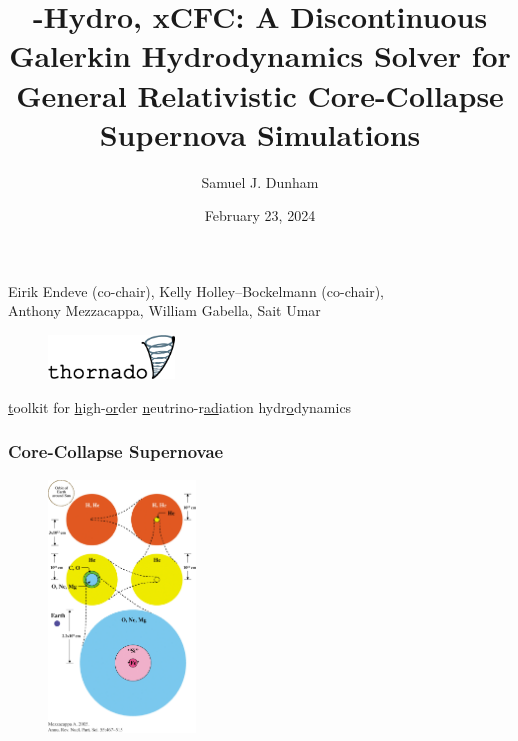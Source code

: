 \documentclass{beamer}
\title[Dissertation Defense]%
{\thornado-Hydro, xCFC: A Discontinuous Galerkin Hydrodynamics %
Solver for General Relativistic %
Core-Collapse Supernova Simulations}
\author{Samuel J. Dunham}
\date{February 23, 2024}
\begin{document}
\begin{frame}

  \maketitle

  \vspace{-1em}

  \begin{center}
    Eirik Endeve (co-chair), %
    Kelly Holley--Bockelmann (co-chair), \\
    Anthony Mezzacappa, %
    William Gabella, %
    Sait Umar
  \end{center}

\end{frame}

\begin{frame}

  \begin{figure}[ht]
    \centering
    \includegraphics[width=0.3\textwidth]{fig.thornado_logo.png}
  \end{figure}

  \begin{center}

    \ul{t}oolkit for
    \ul{h}igh-\ul{or}der
    \ul{n}eutrino-r\ul{ad}iation hydr\ul{o}dynamics\\[1em]

  \end{center}

\end{frame}

\begin{frame}
\frametitle{Core-Collapse Supernovae}

  \begin{figure}[htb!]
    \centering
    \includegraphics[width=0.35\textwidth]{fig.CCSN_01.jpeg}
  \end{figure}

\end{frame}
\end{document}
